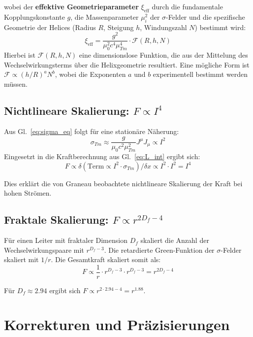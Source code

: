 	wobei der \textbf{effektive Geometrieparameter} $\xi_{\text{eff}}$ durch die fundamentale Kopplungskonstante $g$, die Massenparameter $\mu_i^2$ der $\sigma$-Felder und die spezifische Geometrie der Helices (Radius $R$, Steigung $h$, Windungszahl $N$) bestimmt wird:
	\begin{equation}
		\xi_{\text{eff}} = \frac{g^2}{\mu_0^2 c^4 \mu_{Tm}^4} \cdot \mathcal{F}(R, h, N) \label{eq:xi_effective}
	\end{equation}
	Hierbei ist $\mathcal{F}(R, h, N)$ eine dimensionslose Funktion, die aus der Mittelung des Wechselwirkungsterms über die Helixgeometrie resultiert. Eine mögliche Form ist $\mathcal{F} \propto (h/R)^a N^b$, wobei die Exponenten $a$ und $b$ experimentell bestimmt werden müssen.
	
	\subsection{Nichtlineare Skalierung: $F \propto I^4$}
	Aus Gl.~\ref{eq:sigma_eq} folgt für eine stationäre Näherung:
	\begin{equation}
		\sigma_{Tm} \approx \frac{g}{\mu_0 c^2 \mu_{Tm}^2} J^\mu J_\mu \propto I^2
	\end{equation}
	Eingesetzt in die Kraftberechnung aus Gl.~\ref{eq:L_int} ergibt sich:
	\begin{equation}
		F \propto \delta\left(\text{Term} \propto I^2 \cdot \sigma_{Tm}\right)/\delta x \propto I^2 \cdot I^2 = I^4 \label{eq:I4_scaling}
	\end{equation}
	
	Dies erklärt die von Graneau beobachtete nichtlineare Skalierung der Kraft bei hohen Strömen.
	
	\subsection{Fraktale Skalierung: $F \propto r^{2D_f - 4}$}
	Für einen Leiter mit fraktaler Dimension $D_f$ skaliert die Anzahl der Wechselwirkungspaare mit $r^{D_f - 3}$. Die retardierte Green-Funktion der $\sigma$-Felder skaliert mit $1/r$. Die Gesamtkraft skaliert somit als:
	\begin{equation}
		F \propto \frac{1}{r} \cdot r^{D_f - 3} \cdot r^{D_f - 3} = r^{2D_f - 4} \label{eq:fractal_scaling}
	\end{equation}
	
	Für $D_f \approx 2.94$ ergibt sich $F \propto r^{2 \cdot 2.94 - 4} = r^{1.88}$.
	
	\section{Korrekturen und Präzisierungen}
